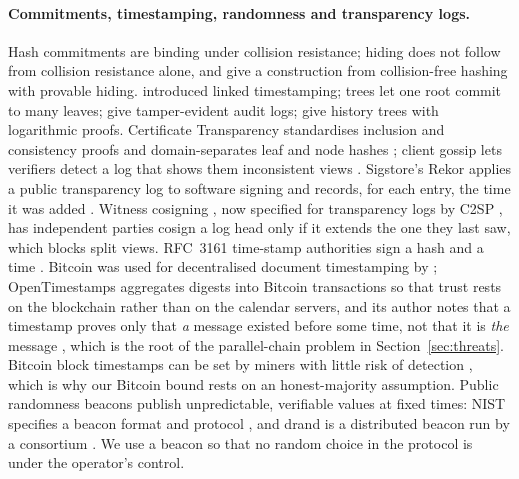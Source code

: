 \documentclass[11pt]{article}
\begin{document}
\paragraph{Commitments, timestamping, randomness and transparency logs.} Hash commitments are binding under collision resistance; hiding does not follow from collision resistance alone, and \citet{halevi1996commit} give a construction from collision-free hashing with provable hiding. \citet{haber1991} introduced linked timestamping; \citet{merkle1988} trees let one root commit to many leaves; \citet{schneier1999audit} give tamper-evident audit logs; \citet{crosby2009} give history trees with logarithmic proofs. Certificate Transparency standardises inclusion and consistency proofs and domain-separates leaf and node hashes \citep{rfc6962,rfc9162}; client gossip lets verifiers detect a log that shows them inconsistent views \citep{chuat2015gossip}. Sigstore's Rekor applies a public transparency log to software signing and records, for each entry, the time it was added \citep{newman2022sigstore,rekor_openapi}. Witness cosigning \citep{syta2016witness}, now specified for transparency logs by C2SP \citep{c2sp_witness}, has independent parties cosign a log head only if it extends the one they last saw, which blocks split views. RFC~3161 time-stamp authorities sign a hash and a time \citep{rfc3161}. Bitcoin \citep{nakamoto2008} was used for decentralised document timestamping by \citet{gipp2015}; OpenTimestamps aggregates digests into Bitcoin transactions so that trust rests on the blockchain rather than on the calendar servers, and its author notes that a timestamp proves only that \emph{a} message existed before some time, not that it is \emph{the} message \citep{todd2016ots}, which is the root of the parallel-chain problem in Section~\ref{sec:threats}. Bitcoin block timestamps can be set by miners with little risk of detection \citep{szalachowski2018timestamps}, which is why our Bitcoin bound rests on an honest-majority assumption. Public randomness beacons publish unpredictable, verifiable values at fixed times: NIST specifies a beacon format and protocol \citep{nist8213}, and drand is a distributed beacon run by a consortium \citep{drand}. We use a beacon so that no random choice in the protocol is under the operator's control.
\end{document}

